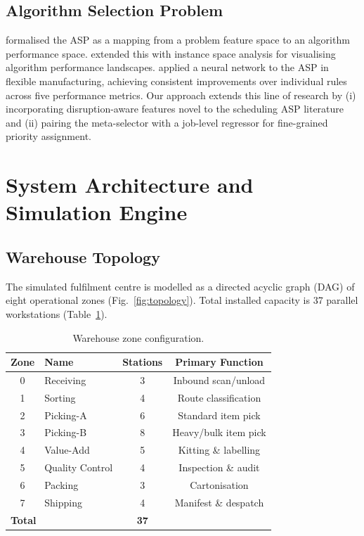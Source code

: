 \documentclass[3p,times]{elsarticle}
\begin{document}
\subsection{Algorithm Selection Problem}
\label{sec:lit_asp}

\citet{Rice1976} formalised the ASP as a mapping from a problem
feature space to an algorithm performance space.
\citet{SmithMiles2012} extended this with instance space analysis
for visualising algorithm performance landscapes.
\citet{MouelhibChibani2010} applied a neural network to the ASP
in flexible manufacturing, achieving consistent improvements over
individual rules across five performance metrics.  Our approach
extends this line of research by (i) incorporating disruption-aware
features novel to the scheduling ASP literature and (ii) pairing
the meta-selector with a job-level regressor for fine-grained
priority assignment.

\section{System Architecture and Simulation Engine}
\label{sec:system}

\subsection{Warehouse Topology}
\label{sec:topology}

The simulated fulfilment centre is modelled as a directed acyclic
graph (DAG) of eight operational zones (Fig.~\ref{fig:topology}).
Total installed capacity is 37 parallel workstations
(Table~\ref{tab:zones}).

\begin{table}[htbp]
  \centering
  \caption{Warehouse zone configuration.}
  \label{tab:zones}
  \begin{tabular*}{\hsize}{@{\extracolsep{\fill}}clcc@{}}
    \toprule
    Zone & Name            & Stations & Primary Function       \\
    \midrule
    0    & Receiving       & 3        & Inbound scan/unload    \\
    1    & Sorting         & 4        & Route classification   \\
    2    & Picking-A       & 6        & Standard item pick     \\
    3    & Picking-B       & 8        & Heavy/bulk item pick   \\
    4    & Value-Add       & 5        & Kitting \& labelling   \\
    5    & Quality Control & 4        & Inspection \& audit    \\
    6    & Packing         & 3        & Cartonisation          \\
    7    & Shipping        & 4        & Manifest \& despatch   \\
    \midrule
    \multicolumn{2}{l}{\textbf{Total}} & \textbf{37} & \\
    \bottomrule
  \end{tabular*}
\end{table}
\end{document}
